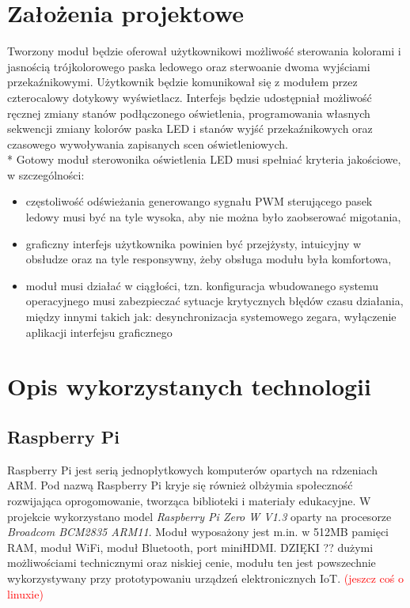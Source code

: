 \documentclass[12pt, eng, twoside, openany, final]{mgr}
\begin{document}
\chapter{Założenia projektowe}
\thispagestyle{fancy}  
    Tworzony moduł będzie oferował użytkownikowi możliwość sterowania kolorami i jasnością trójkolorowego paska ledowego oraz sterwoanie dwoma wyjściami przekaźnikowymi. Użytkownik będzie komunikował się z modułem przez czterocalowy dotykowy wyświetlacz. Interfejs będzie udostępniał możliwość ręcznej zmiany stanów podłączonego oświetlenia, programowania własnych sekwencji zmiany kolorów paska LED i stanów wyjść przekaźnikowych oraz czasowego wywoływania zapisanych scen oświetleniowych.\\*
    Gotowy moduł sterowonika oświetlenia LED musi spełniać kryteria jakościowe, w szczególności:
    \begin{itemize}
        \item częstoliwość odświeżania generowango sygnału PWM sterującego pasek ledowy musi być na tyle wysoka, aby nie można było zaobserować migotania,
        
        \item graficzny interfejs użytkownika powinien być przejżysty, intuicyjny w obsłudze oraz na tyle responsywny, żeby
        obsługa modułu była komfortowa,
        
        \item moduł musi działać w ciągłości, tzn. konfiguracja wbudowanego systemu operacyjnego musi zabezpieczać sytuacje
        krytycznych błędów czasu działania, między innymi takich jak: desynchronizacja systemowego zegara, wyłączenie aplikacji interfejsu graficznego
    \end{itemize}
%
\chapter{Opis wykorzystanych technologii}
\thispagestyle{fancy}
    \section{Raspberry Pi}
    Raspberry Pi jest serią jednopłytkowych komputerów opartych na rdzeniach ARM. Pod nazwą Raspberry Pi kryje się również olbżymia społeczność rozwijająca oprogomowanie, tworząca biblioteki i materiały edukacyjne.
    W projekcie wykorzystano model \emph{Raspberry Pi Zero W V1.3} oparty na procesorze  \emph{Broadcom BCM2835 ARM11}. Moduł wyposażony jest m.in. w 512MB pamięci RAM, moduł WiFi, moduł Bluetooth, port miniHDMI. DZIĘKI ?? dużymi możliwościami technicznymi oraz niskiej cenie, modułu ten jest powszechnie wykorzystywany przy prototypowaniu urządzeń elektronicznych IoT.
    \textcolor{red}{(jeszcz coś o linuxie)}
\end{document}
